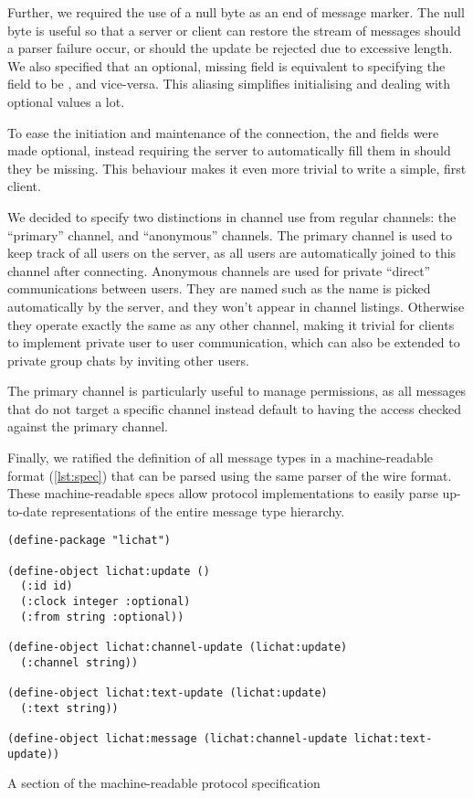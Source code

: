 \documentclass[format=sigconf]{acmart}
\begin{document}
Further, we required the use of a null byte as an end of message marker. The null byte is useful so that a server or client can restore the stream of messages should a parser failure occur, or should the update be rejected due to excessive length. We also specified that an optional, missing field is equivalent to specifying the field to be , and vice-versa. This aliasing simplifies initialising and dealing with optional values a lot.

To ease the initiation and maintenance of the connection, the  and  fields were made optional, instead requiring the server to automatically fill them in should they be missing. This behaviour makes it even more trivial to write a simple, first client.

We decided to specify two distinctions in channel use from regular channels: the ``primary'' channel, and ``anonymous'' channels. The primary channel is used to keep track of all users on the server, as all users are automatically joined to this channel after connecting. Anonymous channels are used for private ``direct'' communications between users. They are named such as the name is picked automatically by the server, and they won't appear in channel listings. Otherwise they operate exactly the same as any other channel, making it trivial for clients to implement private user to user communication, which can also be extended to private group chats by inviting other users.

The primary channel is particularly useful to manage permissions, as all messages that do not target a specific channel instead default to having the access checked against the primary channel.

Finally, we ratified the definition of all message types in a machine-readable format (\autoref{lst:spec}) that can be parsed using the same parser of the wire format. These machine-readable specs allow protocol implementations to easily parse up-to-date representations of the entire message type hierarchy.

\begin{listing}
\begin{verbatim}
(define-package "lichat")

(define-object lichat:update ()
  (:id id)
  (:clock integer :optional)
  (:from string :optional))

(define-object lichat:channel-update (lichat:update)
  (:channel string))

(define-object lichat:text-update (lichat:update)
  (:text string))

(define-object lichat:message (lichat:channel-update lichat:text-update))
\end{verbatim}
\caption{A section of the machine-readable protocol specification}
\label{lst:spec}
\end{listing}
\end{document}
